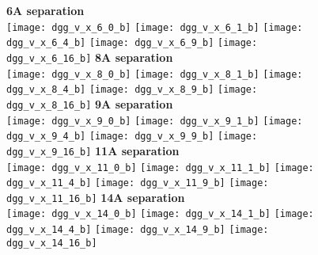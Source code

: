 \documentclass[journal=acsnano,manuscript=article]{achemso}
\begin{document}
\begin{figure}[h!]
	\centering
	\textbf{6A separation} \\
	\texttt{[image: dgg\_v\_x\_6\_0\_b]} 
	\texttt{[image: dgg\_v\_x\_6\_1\_b]}
	\texttt{[image: dgg\_v\_x\_6\_4\_b]}
	\texttt{[image: dgg\_v\_x\_6\_9\_b]}
	\texttt{[image: dgg\_v\_x\_6\_16\_b]}
	\textbf{8A separation} \\ 
	\texttt{[image: dgg\_v\_x\_8\_0\_b]} 
	\texttt{[image: dgg\_v\_x\_8\_1\_b]}
	\texttt{[image: dgg\_v\_x\_8\_4\_b]}
	\texttt{[image: dgg\_v\_x\_8\_9\_b]}
	\texttt{[image: dgg\_v\_x\_8\_16\_b]}
	\textbf{9A separation} \\
	\texttt{[image: dgg\_v\_x\_9\_0\_b]} 
	\texttt{[image: dgg\_v\_x\_9\_1\_b]}
	\texttt{[image: dgg\_v\_x\_9\_4\_b]}
	\texttt{[image: dgg\_v\_x\_9\_9\_b]}
	\texttt{[image: dgg\_v\_x\_9\_16\_b]}
	\textbf{11A separation} \\
	\texttt{[image: dgg\_v\_x\_11\_0\_b]} 
	\texttt{[image: dgg\_v\_x\_11\_1\_b]}
	\texttt{[image: dgg\_v\_x\_11\_4\_b]}
	\texttt{[image: dgg\_v\_x\_11\_9\_b]}
	\texttt{[image: dgg\_v\_x\_11\_16\_b]}
	\textbf{14A separation} \\
	\texttt{[image: dgg\_v\_x\_14\_0\_b]} 
	\texttt{[image: dgg\_v\_x\_14\_1\_b]}
	\texttt{[image: dgg\_v\_x\_14\_4\_b]}
	\texttt{[image: dgg\_v\_x\_14\_9\_b]}
	\texttt{[image: dgg\_v\_x\_14\_16\_b]}
	\label{fig:ang}
\end{figure}
\end{document}

